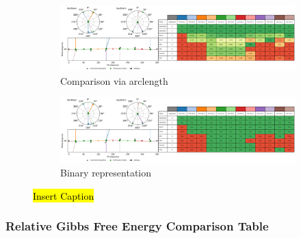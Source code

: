 \documentclass{article}
\begin{document}
\begin{figure}[H]
	\centering
	\begin{subfigure}[b]{1\textwidth}
		\includegraphics[width=1\textwidth,keepaspectratio]
		{figures/oxane/comp_tables/z_dataset-oxane-TS-all-groups-arc_group_WRMSD-table.png}
		\caption{Comparison via arclength}
	\end{subfigure}

	\begin{subfigure}[b]{1\textwidth}
		\includegraphics[width=1\textwidth,keepaspectratio]
		{figures/oxane/comp_tables/z_dataset-oxane-TS-all-groups-arc_comp-table.png}
		\caption{Binary representation}
	\end{subfigure}
\caption{\hl{Insert Caption}}
\label{fig:oxane-ALL-LM}
\end{figure}

\subsubsection{Relative Gibbs Free Energy Comparison Table}
\end{document}
